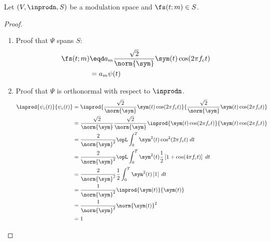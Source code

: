 \begin{proposition}
\label{lem:pam_basis}
Let $(V, \inprodn, S)$ be a modulation space and $\fs(t;m)\in S$.
\end{proposition}
\begin{proof}
\begin{enumerate}
  \item  Proof that $\Psi$ spans $S$:
    \begin{align*}
       \fs(t;m) 
         &\eqd a_m\frac{\sqrt{2}}{\norm{\sym}} \sym(t) \cos(2\pi f_c t) 
       \\&=    a_m\psi(t)
    \end{align*}

  \item Proof that $\Psi$ is orthonormal with respect to $\inprodn$.
  \begin{align*}
   \inprod{\psi_c(t)}{\psi_c(t)}
      &= \inprod{\frac{\sqrt{2}}{\norm{\sym}} \sym(t) \cos(2\pi f_c t)}
                {\frac{\sqrt{2}}{\norm{\sym}} \sym(t) \cos(2\pi f_c t)}
    \\&= \frac{\sqrt{2}}{\norm{\sym}}\frac{\sqrt{2}}{\norm{\sym}}
         \inprod{ \sym(t) \cos(2\pi f_c t)}
                { \sym(t) \cos(2\pi f_c t)}
    \\&= \frac{2}{\norm{\sym}^2}
         \opL
         \int_0^T \sym^2(t) \cos^2(2\pi f_c t) \; dt
    \\&= \frac{2}{\norm{\sym}^2}
         \opL
         \int_0^T \sym^2(t)\frac{1}{2}\left[1+ \cos(4\pi f_c t)\right] \; dt
    \\&= \frac{2}{\norm{\sym}^2}\frac{1}{2}
         \int_0^T \sym^2(t)\left[ 1 \right] \; dt
    \\&= \frac{1}{\norm{\sym}^2}
         \inprod{\sym(t)}{\sym(t)}
    \\&= \frac{1}{\norm{\sym}^2}
         \norm{\sym(t)}^2
    \\&= 1
\end{align*}
\end{enumerate}
\end{proof}

